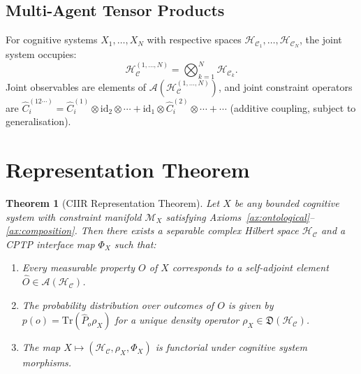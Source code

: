 \documentclass[twocolumn,aps,prd,superscriptaddress,nofootinbib]{revtex4-2}
\newtheorem{theorem}{Theorem}[section]
\newcommand{\HC}{\mathcal{H}_{\mathcal{C}}}
\newcommand{\CM}{\mathcal{M}}
\newcommand{\CA}{\mathcal{A}}
\newcommand{\hatC}{\hat{C}}
\newcommand{\hatO}{\hat{O}}
\newcommand{\hatP}{\hat{P}}
\newcommand{\Tr}{\mathrm{Tr}}
\newcommand{\id}{\mathrm{id}}
\begin{document}
\subsection{Multi-Agent Tensor Products}

For cognitive systems $X_1,\ldots,X_N$ with respective spaces $\HC_1,\ldots,\HC_N$, the joint system occupies:
\begin{equation}
  \HC^{(1,\ldots,N)} = \bigotimes_{k=1}^{N} \HC_k.
  \label{eq:tensor}
\end{equation}
Joint observables are elements of $\CA(\HC^{(1,\ldots,N)})$, and joint
constraint operators are
$\hatC_i^{(12\cdots)} = \hatC_i^{(1)} \otimes \id_2 \otimes \cdots +
\id_1 \otimes \hatC_i^{(2)} \otimes \cdots + \cdots$
(additive coupling, subject to generalisation).

\section{Representation Theorem}
\label{sec:representation}

\begin{theorem}[CIIR Representation Theorem]
\label{thm:representation}
Let $X$ be any bounded cognitive system with constraint manifold $\CM_X$
satisfying Axioms~\ref{ax:ontological}--\ref{ax:composition}.  Then there
exists a separable complex Hilbert space $\HC$ and a CPTP interface map
$\Phi_X$ such that:
\begin{enumerate}
    \item[(i)] Every measurable property $O$ of $X$ corresponds to a
               self-adjoint element $\hatO \in \CA(\HC)$.
    \item[(ii)] The probability distribution over outcomes of $O$ is given by
                $p(o) = \Tr(\hatP_o \rho_X)$ for a unique density operator
                $\rho_X \in \mathfrak{D}(\HC)$.
    \item[(iii)] The map $X \mapsto (\HC, \rho_X, \Phi_X)$ is functorial under
                 cognitive system morphisms.
\end{enumerate}
\end{theorem}
\end{document}
